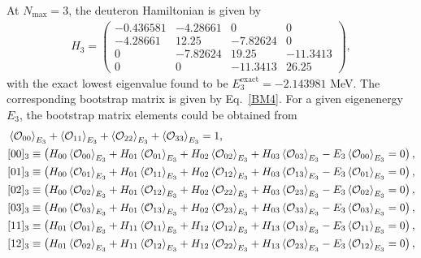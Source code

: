 \documentclass[aps,prc,reprint,superscriptaddress,nofootinbib]{revtex4-2}
\begin{document}
\begin{widetext}
At $N_\text{max}=3$, the deuteron Hamiltonian is given by
\begin{align}
H_3=\left(
\begin{array}{cccc}
-0.436581 & -4.28661 & 0 & 0 \\
-4.28661 & 12.25 & -7.82624 & 0 \\
0 & -7.82624 & 19.25 & -11.3413 \\
0 & 0 & -11.3413 & 26.25
\end{array}
\right),
\end{align}
with the exact lowest eigenvalue found to be $E_3^\text{exact}=-2.143981$ MeV. 
The corresponding bootstrap matrix is given by Eq.~\eqref{BM4}.
For a given eigenenergy $E_3$,
the bootstrap matrix elements could be obtained from
\begin{align}
&\braket{\mathcal{O}_{00}}_{E_3}+\braket{\mathcal{O}_{11}}_{E_3}+\braket{\mathcal{O}_{22}}_{E_3}+\braket{\mathcal{O}_{33}}_{E_3}=1,\nonumber\\
&[00]_3\equiv \left(H_{00}\braket{\mathcal{O}_{00}}_{E_3}+H_{01}\braket{\mathcal{O}_{01}}_{E_3}+H_{02}\braket{\mathcal{O}_{02}}_{E_3}+H_{03}\braket{\mathcal{O}_{03}}_{E_3}-E_3\braket{\mathcal{O}_{00}}_{E_3}=0\right),\nonumber\\
&[01]_3\equiv \left(H_{00}\braket{\mathcal{O}_{01}}_{E_3}+H_{01}\braket{\mathcal{O}_{11}}_{E_3}+H_{02}\braket{\mathcal{O}_{12}}_{E_3}+H_{03}\braket{\mathcal{O}_{13}}_{E_3}-E_3\braket{\mathcal{O}_{01}}_{E_3}=0\right),\nonumber\\
&[02]_3\equiv \left(H_{00}\braket{\mathcal{O}_{02}}_{E_3}+H_{01}\braket{\mathcal{O}_{12}}_{E_3}+H_{02}\braket{\mathcal{O}_{22}}_{E_3}+H_{03}\braket{\mathcal{O}_{23}}_{E_3}-E_3\braket{\mathcal{O}_{02}}_{E_3}=0\right),\nonumber\\
&[03]_3\equiv \left(H_{00}\braket{\mathcal{O}_{03}}_{E_3}+H_{01}\braket{\mathcal{O}_{13}}_{E_3}+H_{02}\braket{\mathcal{O}_{23}}_{E_3}+H_{03}\braket{\mathcal{O}_{33}}_{E_3}-E_3\braket{\mathcal{O}_{03}}_{E_3}=0\right),\nonumber\\
&[11]_3\equiv \left(H_{01}\braket{\mathcal{O}_{01}}_{E_3}+H_{11}\braket{\mathcal{O}_{11}}_{E_3}+H_{12}\braket{\mathcal{O}_{12}}_{E_3}+H_{13}\braket{\mathcal{O}_{13}}_{E_3}-E_3\braket{\mathcal{O}_{11}}_{E_3}=0\right),\nonumber\\
&[12]_3\equiv \left(H_{01}\braket{\mathcal{O}_{02}}_{E_3}+H_{11}\braket{\mathcal{O}_{12}}_{E_3}+H_{12}\braket{\mathcal{O}_{22}}_{E_3}+H_{13}\braket{\mathcal{O}_{23}}_{E_3}-E_3\braket{\mathcal{O}_{12}}_{E_3}=0\right),\nonumber\\

\end{align}
\end{widetext}
\end{document}
